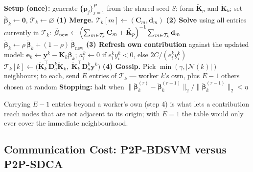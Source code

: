 \begin{algorithm}
\caption{P2P-BDSVM at worker $k$ (one round)}
\begin{algorithmic}[1]
\STATE \textbf{Setup (once):} generate $\{\mathbf{p}_j\}_{j=1}^{P}$ from the
       shared seed $S$; form $\ddot{\mathbf{K}}_p$ and $\ddot{\mathbf{K}}_k$;
       set $\ddot{\boldsymbol{\beta}}_k \leftarrow \mathbf{0}$,
       $\mathcal{T}_k \leftarrow \varnothing$
\STATE
\STATE \textbf{(1) Merge.}
  \STATE $\mathcal{T}_k[m] \leftarrow (\mathbf{C}_m, \mathbf{d}_m)$
         \hfill {}
\ENDFOR
\STATE
\STATE \textbf{(2) Solve} using all entries currently in $\mathcal{T}_k$:
\STATE \quad $\ddot{\boldsymbol{\beta}}_{\text{new}} \leftarrow
       \Bigl( \sum_{m \in \mathcal{T}_k} \mathbf{C}_m + \ddot{\mathbf{K}}_p \Bigr)^{-1}
       \sum_{m \in \mathcal{T}_k} \mathbf{d}_m$
\STATE \quad $\ddot{\boldsymbol{\beta}}_k \leftarrow
       \rho\, \ddot{\boldsymbol{\beta}}_k
       + (1-\rho)\, \ddot{\boldsymbol{\beta}}_{\text{new}}$
\STATE
\STATE \textbf{(3) Refresh own contribution} against the updated model:
\STATE \quad $\mathbf{e}_k \leftarrow
       \mathbf{y}^k - \ddot{\mathbf{K}}_k \ddot{\boldsymbol{\beta}}_k$;\quad
       $a^k_i \leftarrow 0$ if $e^k_i y^k_i < 0$, else $2C / (e^k_i y^k_i)$
\STATE \quad $\mathcal{T}_k[k] \leftarrow
       \bigl( \ddot{\mathbf{K}}_k^{\!\top} \mathbf{D}^k_a \ddot{\mathbf{K}}_k,\;
              \ddot{\mathbf{K}}_k^{\!\top} \mathbf{D}^k_a \mathbf{y}^k \bigr)$
\STATE
\STATE \textbf{(4) Gossip.} Pick $\min(\gamma, |\mathcal{N}(k)|)$ neighbours; to
       each, send $E$ entries of $\mathcal{T}_k$ --- worker $k$'s own, plus
       $E-1$ others chosen at random
\STATE
\STATE \textbf{Stopping:} halt when
       $\|\ddot{\boldsymbol{\beta}}^{(r)}_k - \ddot{\boldsymbol{\beta}}^{(r-1)}_k\|_2
        / \|\ddot{\boldsymbol{\beta}}^{(r-1)}_k\|_2 < \eta$
\end{algorithmic}
\end{algorithm}

Carrying $E-1$ entries beyond a worker's own (step 4) is what lets a
contribution reach nodes that are not adjacent to its origin; with $E = 1$ the
table would only ever cover the immediate neighbourhood.

\subsection{Communication Cost: P2P-BDSVM versus P2P-SDCA}

